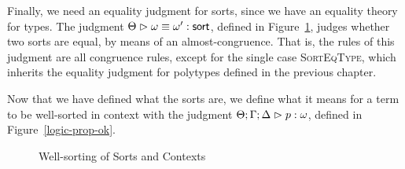 Finally, we need an equality judgment for sorts, since we have an
equality theory for types. The judgment
${\Theta} \vartriangleright {\omega} \equiv {\omega'} : \mathsf{sort}$, defined in
Figure~\ref{logic-sort-ok}, judges whether two sorts are equal, by
means of an almost-congruence. That is, the rules of this judgment
are all congruence rules, except for the single case
\textsc{SortEqType}, which inherits the equality judgment for
polytypes defined in the previous chapter. 

Now that we have defined what the sorts are, we define what it means
for a term to be well-sorted in context with the judgment
${\Theta; \Gamma; \Delta} \vartriangleright {p} : {\omega}$, defined in Figure~\ref{logic-prop-ok}.

\begin{figure}
\caption{Well-sorting of Sorts and Contexts}
\label{logic-sort-ok}
\end{figure}


